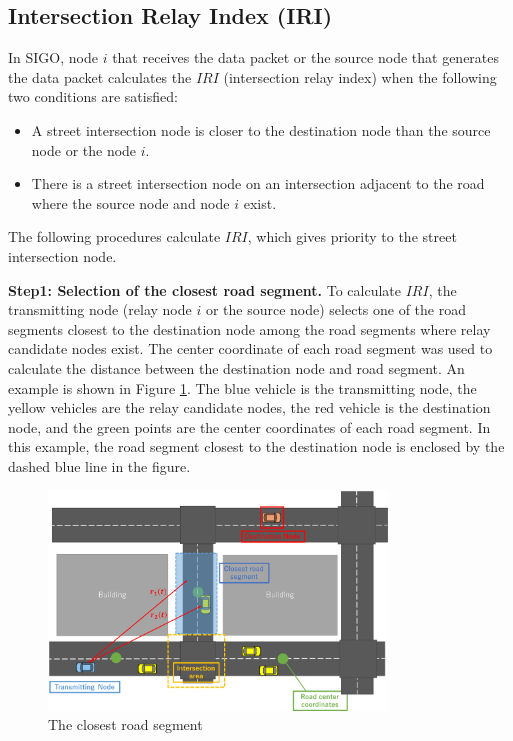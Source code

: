 \documentclass[conference]{IEEEtran}
\begin{document}
\subsection{Intersection Relay Index (IRI)}

In SIGO, node $i$ that receives the data packet or the  source node that generates the data packet calculates the 
$IRI$ (intersection relay index) when the following two conditions are satisfied:
\begin{itemize}
\item A street intersection node is closer to the destination node than the source node or the node $i$.
\item There is a street intersection node on an intersection adjacent to the road where the source node and node $i$ exist.
\end{itemize}

The following procedures calculate $IRI$, which gives priority to  the street intersection node.

\textbf{Step1: Selection of the closest road segment.}
To calculate $IRI$, the transmitting node (relay node $i$ or the source node) selects one of the road segments closest to the destination node among the road segments where relay candidate nodes exist.
The center coordinate of each road segment was used to calculate the distance between the destination node and road segment. An example is shown in Figure \ref{fig:closest_road}.
The blue vehicle is the transmitting node, the yellow vehicles are the relay candidate nodes, the red vehicle is the destination node, and the green points are the center coordinates of each road segment. In this example, the road segment closest to the destination node is  enclosed by the dashed blue line in the figure.


\begin{figure}[!ht]
\centering
\includegraphics[width=90mm]{figures/closest_road.eps}
\caption{The closest road segment}
\label{fig:closest_road}
\end{figure}
\end{document}
